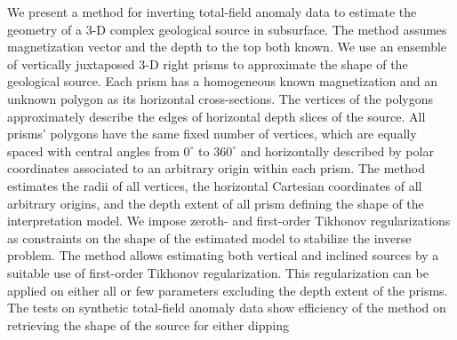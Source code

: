 \begin{summary}
We present a method for inverting total-field anomaly data to estimate the geometry of a 3-D complex geological source in subsurface. The method assumes magnetization vector and the depth to the top both known. We use an ensemble of vertically juxtaposed 3-D right prisms to approximate the shape of the geological source. Each prism has a homogeneous known magnetization and an unknown polygon as its horizontal cross-sections. The vertices of the polygons approximately describe the edges of horizontal depth slices of the source. All prisms’ polygons have the same fixed number of vertices, which are equally spaced with central angles from $0^{\circ}$ to $360^{\circ}$ and horizontally described by polar coordinates associated to an arbitrary origin within each prism. The method estimates the radii of all vertices, the horizontal Cartesian coordinates of all arbitrary origins, and the depth extent of all prism defining the shape of the interpretation model. We impose zeroth- and first-order Tikhonov regularizations as constraints on the shape of the estimated model to stabilize the inverse problem. The method allows estimating both vertical and inclined sources by a suitable use of first-order Tikhonov regularization. This regularization can be applied on either all or few parameters excluding the depth extent of the prisms. The tests on synthetic total-field anomaly data show efficiency of the method on retrieving the shape of the source for either dipping
\end{summary}
